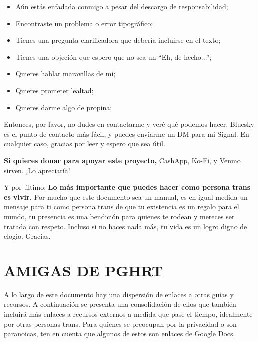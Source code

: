 \documentclass{article}
\begin{document}
\begin{itemize}
\item Aún estás enfadada conmigo a pesar del descargo de responsabilidad;

\item Encontraste un problema o error tipográfico;

\item Tienes una pregunta clarificadora que debería incluirse en el texto;

\item Tienes una objeción que espero que no sea un “Eh, de hecho...”;

\item Quieres hablar maravillas de mí;

\item Quieres prometer lealtad;

\item Quieres darme algo de propina;
\end{itemize}

Entonces, por favor, no dudes en contactarme y veré qué podemos hacer. Bluesky es el punto de contacto más fácil, y puedes enviarme un DM para mi Signal. En cualquier caso, gracias por leer y espero que sea útil.

\textbf{Si quieres donar para apoyar este proyecto,} \href{https://cash.app/Katitties}{CashApp}, \href{https://ko-fi.com/katitties}{Ko-Fi}, y \href{https://account.venmo.com/u/katitties}{Venmo} sirven. ¡Lo apreciaría!

Y por último: \textbf{Lo más importante que puedes hacer como persona trans es vivir.} Por mucho que este documento sea un manual, es en igual medida un mensaje para ti como persona trans de que tu existencia es un regalo para el mundo, tu presencia es una bendición para quienes te rodean y mereces ser tratada con respeto. Incluso si no haces nada más, tu vida es un logro digno de elogio. Gracias.



\section*{AMIGAS DE PGHRT}\label{FOPGHRT}

A lo largo de este documento hay una dispersión de enlaces a otras guías y recursos. A continuación se presenta una consolidación de ellos que también incluirá más enlaces a recursos externos a medida que pase el tiempo, idealmente por otras personas trans. Para quienes se preocupan por la privacidad o son paranoicas, ten en cuenta que algunos de estos son enlaces de Google Docs.
\end{document}
